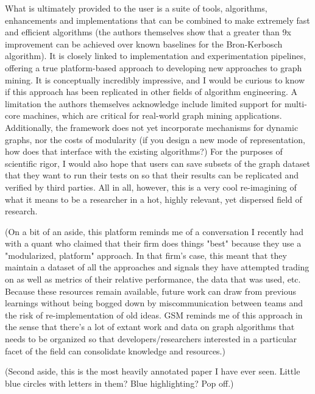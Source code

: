 What is ultimately provided to the user is a suite of tools, algorithms, enhancements and implementations that can be combined to make extremely fast and efficient algorithms (the authors themselves show that a greater than 9x improvement can be achieved over known baselines for the Bron-Kerbosch algorithm). It is closely linked to implementation and experimentation pipelines, offering a true platform-based approach to developing new approaches to graph mining. It is conceptually incredibly impressive, and I would be curious to know if this approach has been replicated in other fields of algorithm engineering. A limitation the authors themselves acknowledge include limited support for multi-core machines, which are critical for real-world graph mining applications. Additionally, the framework does not yet incorporate mechanisms for dynamic graphs, nor the costs of modularity (if you design a new mode of representation, how does that interface with the existing algorithms?) For the purposes of scientific rigor, I would also hope that users can save subsets of the graph dataset that they want to run their tests on so that their results can be replicated and verified by third parties. All in all, however, this is a very cool re-imagining of what it means to be a researcher in a hot, highly relevant, yet dispersed field of research. 

(On a bit of an aside, this platform reminds me of a conversation I recently had with a quant who claimed that their firm does things "best" because they use a "modularized, platform" approach. In that firm's case, this meant that they maintain a dataset of all the approaches and signals they have attempted trading on as well as metrics of their relative performance, the data that was used, etc. Because these resources remain available, future work can draw from previous learnings without being bogged down by miscommunication between teams and the risk of re-implementation of old ideas. GSM reminds me of this approach in the sense that there's a lot of extant work and data on graph algorithms that needs to be organized so that developers/researchers interested in a particular facet of the field can consolidate knowledge and resources.)

(Second aside, this is the most heavily annotated paper I have ever seen. Little blue circles with letters in them? Blue highlighting? Pop off.)